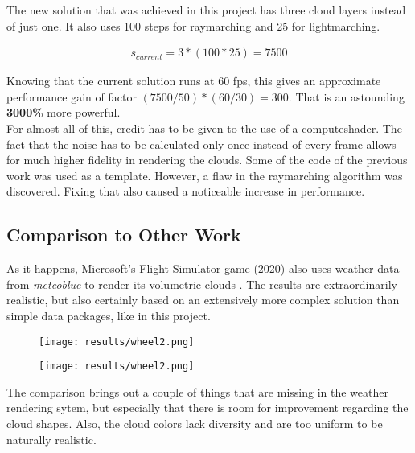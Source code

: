 \noindent
The new solution that was achieved in this project has three cloud layers instead of just one.
It also uses 100 steps for \gls{raymarching} and 25 for \gls{lightmarching}.

$$
\begin{array}{l}
    s_{current} = 3 * (100 * 25) = 7500
\end{array}
$$

\noindent
Knowing that the current solution runs at 60 \gls{fps}, this gives an approximate performance gain of factor $(7500 / 50) * (60/30) = 300$.
That is an astounding \textbf{3000\%} more powerful.
\\
For almost all of this, credit has to be given to the use of a \gls{computeshader}.
The fact that the \gls{noise} has to be calculated only once instead of every frame allows for much higher fidelity in rendering the clouds.
\emptyline
Some of the code of the previous work was used as a template.
However, a flaw in the \gls{raymarching} algorithm was discovered.
Fixing that also caused a noticeable increase in performance.

\subsection{Comparison to Other Work}
As it happens, Microsoft's Flight Simulator game (2020) also uses weather data from \emph{meteoblue} to render its \gls{volumetric} clouds \cite{meteoblue:msfs}.
The results are extraordinarily realistic, but also certainly based on an extensively more complex solution than simple data packages, like in this project.

\begin{figure}[H]
    \centering
        \begin{minipage}{0.47\linewidth}
            \texttt{[image: results/wheel2.png]}
            \label{img:msfs:1}
        \end{minipage}
    \hfill
        \begin{minipage}{0.47\linewidth}
            \texttt{[image: results/wheel2.png]}
            \label{img:msfs:2}
        \end{minipage}
\end{figure}

\noindent
The comparison brings out a couple of things that are missing in the weather rendering sytem, but especially that there is room for improvement regarding the cloud shapes.
Also, the cloud colors lack diversity and are too uniform to be naturally realistic.